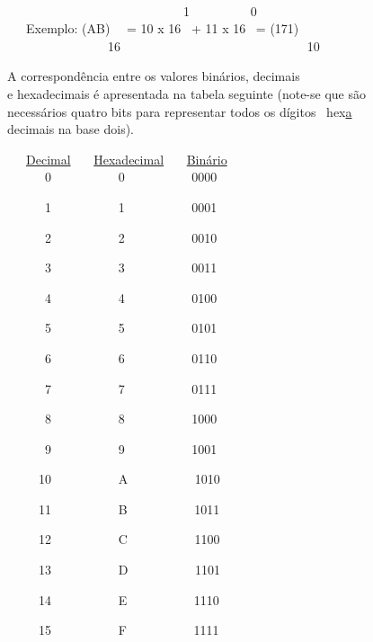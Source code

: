 \documentclass[a4paper,12pt]{article}
\begin{document}
\noindent \\[-3em]
\phantom \ \ \ \ \ \ \ \ \ \ \ \ \ \ \ \ \ \ \ \ \ \ \ \ \ \ \ \ 1 \ \ \ \ \ \ \ \ \ 0\\[-1em] 
\phantom \ \ \ Exemplo: (AB) \ \ = 10 x 16 \ + 11 x 16 \ = (171)\\[-1em]
\phantom \ \ \ \ \ \ \ \ \ \ \ \ \ \ \ \ 16 \ \ \ \ \ \ \ \ \ \ \ \ \ \ \ \ \ \ \ \ \ \ \ \ \ \ \ \ \ 10\\[-0.5em]
\par
A correspondência entre os valores binários, decimais\\
e hexadecimais é apresentada na tabela seguinte (note-se que são\\
necessários quatro bits para representar todos os dígitos \ hex\uline a\\
decimais na base dois).

\newpage

\ \ \ \uline{Decimal} \ \ \ \uline{Hexadecimal} \ \ \ \uline{Binário}\\[-1em]

\ \ \ \ \ \ 0 \ \ \ \ \ \ \ \ \ \ 0 \ \ \ \ \ \ \ \ \ \ 0000\par
\ \ \ \ \ \ 1 \ \ \ \ \ \ \ \ \ \ 1 \ \ \ \ \ \ \ \ \ \ 0001\par
\ \ \ \ \ \ 2 \ \ \ \ \ \ \ \ \ \ 2 \ \ \ \ \ \ \ \ \ \ 0010\par
\ \ \ \ \ \ 3 \ \ \ \ \ \ \ \ \ \ 3 \ \ \ \ \ \ \ \ \ \ 0011\par
\ \ \ \ \ \ 4 \ \ \ \ \ \ \ \ \ \ 4 \ \ \ \ \ \ \ \ \ \ 0100\par
\ \ \ \ \ \ 5 \ \ \ \ \ \ \ \ \ \ 5 \ \ \ \ \ \ \ \ \ \ 0101\par
\ \ \ \ \ \ 6 \ \ \ \ \ \ \ \ \ \ 6 \ \ \ \ \ \ \ \ \ \ 0110\par
\ \ \ \ \ \ 7 \ \ \ \ \ \ \ \ \ \ 7 \ \ \ \ \ \ \ \ \ \ 0111\par
\ \ \ \ \ \ 8 \ \ \ \ \ \ \ \ \ \ 8 \ \ \ \ \ \ \ \ \ \ 1000\par
\ \ \ \ \ \ 9 \ \ \ \ \ \ \ \ \ \ 9 \ \ \ \ \ \ \ \ \ \ 1001\par
\ \ \ \ \ 10 \ \ \ \ \ \ \ \ \ \ A \ \ \ \ \ \ \ \ \ \ 1010\par
\ \ \ \ \ 11 \ \ \ \ \ \ \ \ \ \ B \ \ \ \ \ \ \ \ \ \ 1011\par
\ \ \ \ \ 12 \ \ \ \ \ \ \ \ \ \ C \ \ \ \ \ \ \ \ \ \ 1100\par
\ \ \ \ \ 13 \ \ \ \ \ \ \ \ \ \ D \ \ \ \ \ \ \ \ \ \ 1101\par
\ \ \ \ \ 14 \ \ \ \ \ \ \ \ \ \ E \ \ \ \ \ \ \ \ \ \ 1110\par
\ \ \ \ \ 15 \ \ \ \ \ \ \ \ \ \ F \ \ \ \ \ \ \ \ \ \ 1111\\
\end{document}
